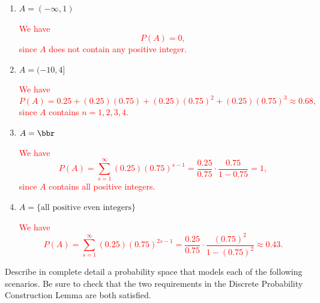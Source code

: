 \documentclass[12pt,reqno]{amsart}
\begin{document}
\medskip
\begin{enumerate}
    \item $A = (-\infty,1)$
    
    \bigskip
    \textcolor{red}{We have
            \[P(A) = 0,\]
    since $A$ does not contain any positive integer.}
    \bigskip

    \item $A = (-10, 4]$
    
    \bigskip
    \textcolor{red}{We have
            \[P(A) = 0.25 + (0.25)(0.75) + (0.25)(0.75)^2+ (0.25)(0.75)^3\approx 0.68,\]
    since $A$ contains $n=1,2,3,4$.}
    \bigskip

    \item $A = \bbr$
    
    \bigskip
    \textcolor{red}{We have
        \[
        P(A) = \sum_{s=1}^\infty (0.25)(0.75)^{s-1} = \frac{0.25}{0.75} \cdot \frac{0.75}{1-0.75} = 1,
        \]
    since $A$ contains all positive integers.}
    \bigskip
    
    \item $A = \{\text{all positive even integers}\}$
    
    \bigskip
    \textcolor{red}{We have
        \[
        P(A) = \sum_{s=1}^\infty (0.25)(0.75)^{2s-1} = \frac{0.25}{0.75} \cdot \frac{(0.75)^2}{1-(0.75)^2} \approx 0.43.
        \]}
\end{enumerate}
















\bigskip
\prob Describe in complete detail a probability space that models each of the following scenarios. Be sure to check that the two requirements in the Discrete Probability Construction Lemma are both satisfied.
\end{document}
